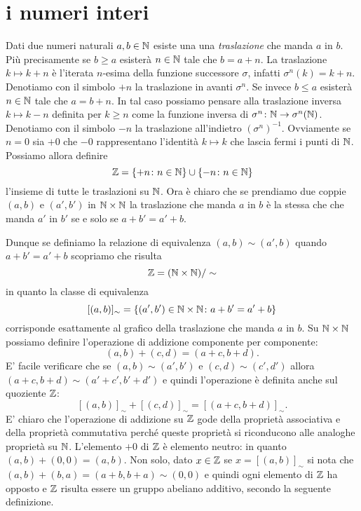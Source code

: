 \section{i numeri interi}

Dati due numeri naturali $a,b \in {\mathbb N}$ esiste una una \emph{traslazione}
che manda $a$ in $b$.
Più precisamente se $b\ge a$ esisterà $n\in {\mathbb N}$ tale che $b=a+n$.
La traslazione $k\mapsto k+n$ è l'iterata $n$-esima della funzione 
successore $\sigma$, infatti $\sigma^n(k) = k+n$.
Denotiamo con il simbolo $+n$ la traslazione in avanti $\sigma^n$.
Se invece $b\le a$ esisterà $n\in {\mathbb N}$ tale che $a=b+n$. 
In tal caso possiamo pensare alla traslazione inversa $k\mapsto k-n$ 
definita per $k\ge n$ come la funzione inversa di 
$\sigma^n\colon {\mathbb N}\to \sigma^n({\mathbb N})$.
Denotiamo con il simbolo $-n$ la traslazione all'indietro $(\sigma^n)^{-1}$.
Ovviamente se $n=0$ sia $+0$ che $-0$ rappresentano l'identità $k\mapsto k$
che lascia fermi i punti di ${\mathbb N}$.
Possiamo allora definire 
\[
  {\mathbb Z} = {\left\{ +n\colon n\in {\mathbb N} \right\}} \cup {\left\{ -n\colon n\in {\mathbb N}\right\}}
\]
l'insieme di tutte le traslazioni su ${\mathbb N}$.
Ora è chiaro che se prendiamo due coppie $(a,b)$ e $(a',b')$ in 
${\mathbb N}\times {\mathbb N}$ la traslazione che manda $a$ in $b$ 
è la stessa che che manda $a'$ in $b'$ se e solo se $a+b'=a'+b$.
    
Dunque se definiamo la relazione di equivalenza $(a,b) \sim (a',b)$
quando $a+b'=a'+b$
scopriamo che risulta 
\[
  {\mathbb Z} = ({\mathbb N} \times {\mathbb N})/\sim  
\]
in quanto la classe di equivalenza 
\[
  [(a,b)]_\sim = {\left\{ (a',b')\in {\mathbb N}\times {\mathbb N} \colon a+b'=a'+b \right\}}
\]
corrisponde esattamente al grafico della traslazione che manda $a$ in $b$.
Su ${\mathbb N}\times {\mathbb N}$ possiamo definire l'operazione di addizione
componente per componente:
\[
 (a,b) + (c,d) = (a+c,b+d).  
\]
E' facile verificare che se $(a,b)\sim (a',b')$ e $(c,d)\sim(c',d')$
allora $(a+c,b+d) \sim (a'+c',b'+d')$ e quindi l'operazione è definita 
anche sul quoziente ${\mathbb Z}$:
\[
[(a,b)]_\sim + [(c,d)]_\sim = [(a+c,b+d)]_\sim.  
\]
E' chiaro che l'operazione di addizione su ${\mathbb Z}$ gode della proprietà 
associativa e della proprietà commutativa perché queste proprietà 
si riconducono alle analoghe proprietà su ${\mathbb N}$.
L'elemento $+0$ di ${\mathbb Z}$ è elemento neutro: in quanto $(a,b) + (0,0) = (a,b)$.
Non solo, dato $x\in {\mathbb Z}$ se $x=[(a,b)]_\sim$ 
si nota che $(a,b) + (b,a) = (a+b,b+a) \sim (0,0)$ e quindi
ogni elemento di ${\mathbb Z}$ ha opposto e ${\mathbb Z}$ risulta essere un gruppo 
abeliano additivo, secondo la seguente definizione.


